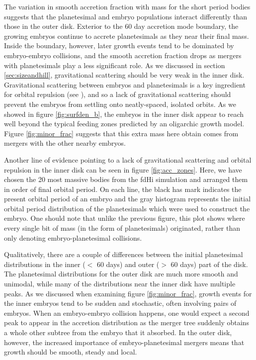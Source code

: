 \documentclass[twocolumn]{aastex63}
\begin{document}
The variation in smooth accretion fraction with mass for the short period bodies suggests that the planetesimal and embryo populations interact differently than those in the outer disk. Exterior to the 60 day accretion mode boundary, the growing embryos continue to accrete planetesimals as they near their final mass. Inside the boundary, however, later growth events tend to be dominated by embryo-embryo collisions, and the smooth accretion fraction drops as mergers with planetesimals play a less significant role. As we discussed in section \ref{sec:sizeandhill}, gravitational scattering should be very weak in the inner disk. Gravitational scattering between embryos and planetesimals is a key ingredient for orbital repulsion (see \citet{kokubo98}), and so a lack of gravitational scattering should prevent the embryos from settling onto neatly-spaced, isolated orbits. As we showed in figure \ref{fig:surfden_b}, the embryos in the inner disk appear to reach well beyond the typical feeding zones predicted by an oligarchic growth model. Figure \ref{fig:minor_frac} suggests that this extra mass here obtain comes from mergers with the other nearby embryos.

Another line of evidence pointing to a lack of gravitational scattering and orbital repulsion in the inner disk can be seen in figure \ref{fig:acc_zones}. Here, we have chosen the 20 most massive bodies from the fdHi simulation and arranged them in order of final orbital period. On each line, the black has mark indicates the present orbital period of an embryo and the gray histogram represents the initial orbital period distribution of the planetesimals which were used to construct the embryo. One should note that unlike the previous figure, this plot shows where every single bit of mass (in the form of planetesimals) originated, rather than only denoting embryo-planetesimal collisions.

Qualitatively, there are a couple of differences between the initial planetesimal distributions in the inner ($<$ 60 days) and outer ($>$ 60 days) part of the disk. The planetesimal distributions for the outer disk are much more smooth and unimodal, while many of the distributions near the inner disk have multiple peaks. As we discussed when examining figure \ref{fig:minor_frac}, growth events for the inner embryos tend to be sudden and stochastic, often involving pairs of embryos. When an embryo-embryo collision happens, one would expect a second peak to appear in the accretion distribution as the merger tree suddenly obtains a whole other subtree from the embryo that it absorbed. In the outer disk, however, the increased importance of embryo-planetesimal mergers means that growth should be smooth, steady and local.
\end{document}
